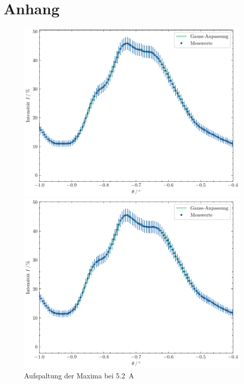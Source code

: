 \section{Anhang}\label{sec:anhang}

\begin{figure}[h]
    \centering
    \begin{minipage}{0.45\linewidth}
        \centering
        \includegraphics[width=\linewidth]{../figs/gauss_i4.7.pdf}
        \caption{Aufspaltung der Maxima bei \SI{4.7}{\ampere}}
        \label{fig:gauss_i47}
    \end{minipage}
    \hspace{.5cm}
    \begin{minipage}{0.45\linewidth} 
        \centering
        \includegraphics[width=\linewidth]{../figs/gauss_i5.2.pdf}
        \caption{Aufspaltung der Maxima bei \SI{5.2}{\ampere}} 
        \label{fig:gauss_i52}
    \end{minipage}
\end{figure}

